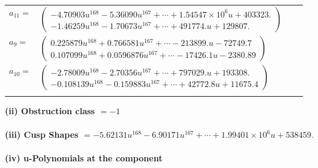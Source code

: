 \documentclass[1p]{elsarticle_modified}
\theoremstyle{definition}
\begin{document}
\begin{tabular}{m{7pt} m{180pt} m{7pt} m{180pt} }
\flushright $a_{11}=$&$\begin{pmatrix}-4.70903 u^{168}-5.36090 u^{167}+\cdots+1.54547\times10^{6} u+403323.\\-1.46259 u^{168}-1.70673 u^{167}+\cdots+491774. u+129807.\end{pmatrix}$ \\
\flushright $a_{9}=$&$\begin{pmatrix}0.225879 u^{168}+0.766581 u^{167}+\cdots-213899. u-72749.7\\0.107099 u^{168}+0.0596876 u^{167}+\cdots-17426.1 u-2380.89\end{pmatrix}$ \\
\flushright $a_{10}=$&$\begin{pmatrix}-2.78009 u^{168}-2.70356 u^{167}+\cdots+797029. u+193308.\\-0.108139 u^{168}-0.159883 u^{167}+\cdots+42772.8 u+11675.4\end{pmatrix}$\\&\end{tabular}
\flushleft \textbf{(ii) Obstruction class $= -1$}\\~\\
\flushleft \textbf{(iii) Cusp Shapes $= -5.62131 u^{168}-6.90171 u^{167}+\cdots+1.99401\times10^{6} u+538459.$}\\~\\
\newpage\renewcommand{\arraystretch}{1}
\flushleft \textbf{(iv) u-Polynomials at the component}\newline \\
\end{document}

